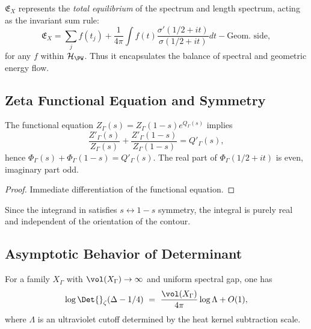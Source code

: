 \begin{remark}[Interpretation]\label{rem:interpretation}\relax
$\mathfrak{E}_X$ represents the \emph{total equilibrium} of the spectrum and length spectrum, acting as the invariant sum rule:
\[
\mathfrak{E}_X = \sum_j f(t_j) + \frac{1}{4\pi}\int f(t)\frac{\sigma'(1/2+it)}{\sigma(1/2+it)}dt - \text{Geom. side},
\]
for any $f$ within $\mathcal{H}_{\PW}$. Thus it encapsulates the balance of spectral and geometric energy flow. %
\end{remark}

\subsection{Zeta Functional Equation and Symmetry}\relax\hspace{0pt}
\label{subsec:zeta-sym}\relax\hspace{0pt}

\begin{lemma}\label{lem:duality}\relax
The functional equation $Z_\Gamma(s)=Z_\Gamma(1-s)e^{Q_\Gamma(s)}$ implies
\[
\frac{Z'_\Gamma(s)}{Z_\Gamma(s)}+\frac{Z'_\Gamma(1-s)}{Z_\Gamma(1-s)}=Q'_\Gamma(s),
\]
hence $\Phi_\Gamma(s)+\Phi_\Gamma(1-s)=Q'_\Gamma(s)$.
The real part of $\Phi_\Gamma(1/2+it)$ is even, imaginary part odd. %
\end{lemma}

\begin{proof}\relax
Immediate differentiation of the functional equation. %
\end{proof}

\begin{remark}\label{rem:symmetry-E}\relax
Since the integrand in  satisfies $s\leftrightarrow 1-s$ symmetry, the integral is purely real and independent of the orientation of the contour. %
\end{remark}

\subsection{Asymptotic Behavior of Determinant}\relax\hspace{0pt}
\label{subsec:asymptotic-det}\relax\hspace{0pt}

\begin{proposition}\label{prop:asymptotic}\relax
For a family $X_\Gamma$ with $\vol(X_\Gamma)\to\infty$ and uniform spectral gap, one has
\[
\log\Det{}_\zeta(\Delta-1/4)\ =\ \frac{\vol(X_\Gamma)}{4\pi}\log\Lambda + O(1),
\]
where $\Lambda$ is an ultraviolet cutoff determined by the heat kernel subtraction scale. %
\end{proposition}

